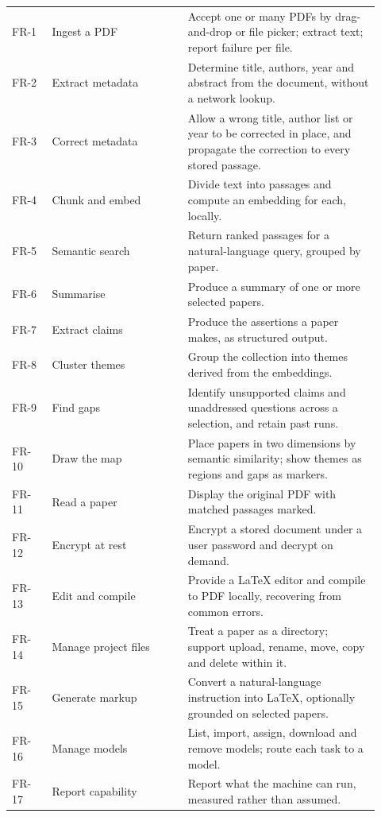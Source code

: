 \documentclass[12pt,a4paper]{report}
\begin{document}
\begin{longtable}{@{}p{0.10\linewidth}p{0.34\linewidth}p{0.48\linewidth}@{}}
FR-1  & Ingest a PDF & Accept one or many PDFs by drag-and-drop or file
        picker; extract text; report failure per file. \\
FR-2  & Extract metadata & Determine title, authors, year and abstract from the
        document, without a network lookup. \\
FR-3  & Correct metadata & Allow a wrong title, author list or year to be
        corrected in place, and propagate the correction to every stored
        passage. \\
FR-4  & Chunk and embed & Divide text into passages and compute an embedding
        for each, locally. \\
FR-5  & Semantic search & Return ranked passages for a natural-language query,
        grouped by paper. \\
FR-6  & Summarise & Produce a summary of one or more selected papers. \\
FR-7  & Extract claims & Produce the assertions a paper makes, as structured
        output. \\
FR-8  & Cluster themes & Group the collection into themes derived from the
        embeddings. \\
FR-9  & Find gaps & Identify unsupported claims and unaddressed questions
        across a selection, and retain past runs. \\
FR-10 & Draw the map & Place papers in two dimensions by semantic similarity;
        show themes as regions and gaps as markers. \\
FR-11 & Read a paper & Display the original PDF with matched passages marked. \\
FR-12 & Encrypt at rest & Encrypt a stored document under a user password and
        decrypt on demand. \\
FR-13 & Edit and compile & Provide a \LaTeX{} editor and compile to PDF
        locally, recovering from common errors. \\
FR-14 & Manage project files & Treat a paper as a directory; support upload,
        rename, move, copy and delete within it. \\
FR-15 & Generate markup & Convert a natural-language instruction into \LaTeX{},
        optionally grounded on selected papers. \\
FR-16 & Manage models & List, import, assign, download and remove models;
        route each task to a model. \\
FR-17 & Report capability & Report what the machine can run, measured rather
        than assumed. \\

\end{longtable}
\end{document}
